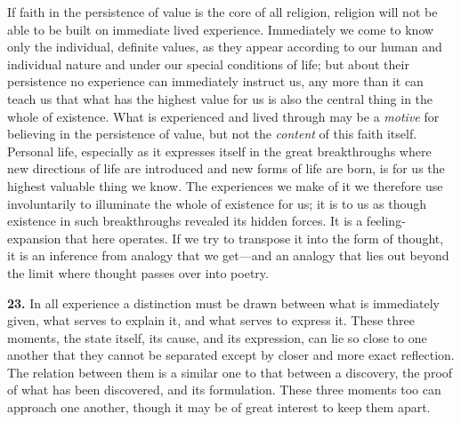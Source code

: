 \documentclass[12pt,a4paper]{book}
\newcommand{\opage}[1]{\marginnote{\footnotesize\textit{[#1]}}}
\begin{document}
If faith in the persistence of value is the core of all religion, religion will
not be able to be built on immediate lived experience. Immediately we come to
know only the individual, definite values, as they appear according to our
human and individual nature and under our special conditions of life; but about
their persistence no experience can immediately instruct us, any more than it
can teach us that what has the highest value for us is also the central thing
in the whole of existence. What is experienced and lived through may be a
\emph{motive} for believing in the persistence of value, but not the
\emph{content} of this faith itself. Personal life, especially as it expresses
itself in the great breakthroughs where new directions of life are introduced
and new forms of life are born, is for us the highest valuable thing we know.
The experiences we make of it we therefore use involuntarily to illuminate the
whole of existence for us; it is to us as though existence in such
breakthroughs revealed its hidden forces. It is a feeling-expansion that here
operates. If we try to transpose it into the form of thought, it is an
inference from analogy that we get---and an analogy that lies out beyond the
limit where thought passes over into poetry.

\medskip

\noindent\textbf{23.} In all experience a distinction must be drawn between
what is immediately given, what serves to explain it, and what serves to
express it. These three moments, the state itself, its cause, and its
expression, can lie so close to one another that they cannot be separated
except by closer and more exact reflection. The relation 
\opage{57}between them is a
similar one to that between a discovery, the proof of what has been discovered,
and its formulation. These three moments too can approach one another, though
it may be of great interest to keep them apart.
\end{document}
